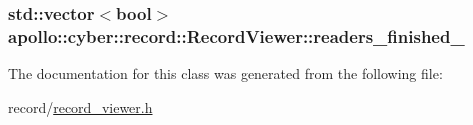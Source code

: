 \hypertarget{classapollo_1_1cyber_1_1record_1_1RecordViewer_a08005bf5452618ab9bdedd6f54da1bc9}{
\subsubsection[{readers\-\_\-finished\-\_\-}]{\setlength{\rightskip}{0pt plus 5cm}std\-::vector$<$bool$>$ apollo\-::cyber\-::record\-::\-Record\-Viewer\-::readers\-\_\-finished\-\_\-\hspace{0.3cm}{\ttfamily [private]}}}\label{classapollo_1_1cyber_1_1record_1_1RecordViewer_a08005bf5452618ab9bdedd6f54da1bc9}


The documentation for this class was generated from the following file\-:\begin{DoxyCompactItemize}
\item 
record/\hyperlink{record__viewer_8h}{record\-\_\-viewer.\-h}\end{DoxyCompactItemize}
